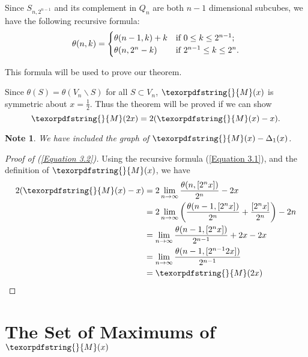 \documentclass[12pt]{ucthesis}
\theoremstyle{plain}
\newtheorem*{note}{Note}
\theoremstyle{definition}
\newcommand{\takagi}{
  \texorpdfstring{\protect}{M}
}
\begin{document}
Since $S_{n, 2^{n - 1}}$ and its complement in $Q_n$ are both $n - 1$ dimensional subcubes,
we have the following recursive formula:
\begin{equation}
\label{Equation 3.1}
\theta(n, k) = \begin{cases}
	\theta(n - 1, k) + k & \textnormal{if } 0 \le k \le 2^{n - 1}; \\
	\theta(n, 2^n - k) & \textnormal{if } 2^{n - 1} \le k \le 2^n.
\end{cases}
\end{equation}

This formula will be used to prove our theorem.

Since $\theta(S) = \theta(V_n \backslash S)$ for all $S \subset V_n$,
$\takagi(x)$ is symmetric about $x = \frac{1}{2}$.
Thus the theorem will be proved if we can show
\begin{equation}
\label{Equation 3.2}
\takagi(2 x) = 2 (\takagi(x) - x).
\end{equation}

\begin{note}
We have included the graph of $\takagi(x) - \Delta_1(x)$.
\end{note}
\begin{figure}[h!]
	\centering
	
\end{figure}

\begin{proof}[Proof of (\ref{Equation 3.2})]
Using the recursive formula (\ref{Equation 3.1}),
and the definition of $\takagi(x)$, we have
\begin{align*}
2 (\takagi(x) - x)
& = 2 \lim_{n \rightarrow \infty} \frac{\theta(n, [2^n x])}{2^n} - 2 x \\
& = 2 \lim_{n \rightarrow \infty} \left(\frac{\theta(n - 1, [2^n x])}{2^n} +
\frac{[2^n x]}{2^n}\right) - 2 n \\
& = \lim_{n \rightarrow \infty} \frac{\theta(n - 1, [2^n x])}{2^{n - 1}} + 2 x - 2 x \\
& = \lim_{n \rightarrow \infty} \frac{\theta(n - 1, [2^{n - 1} 2 x])}{2^{n - 1}} \\
& = \takagi(2 x)
\end{align*}
\end{proof}

\section{The Set of Maximums of $\takagi(x)$}
\label{Section 3.3}
\end{document}
